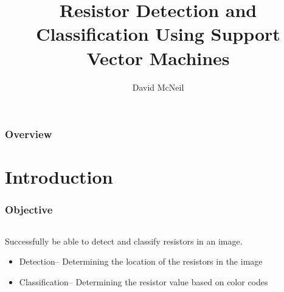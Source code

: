 \documentclass{beamer}
\title[Resistor Identification]{Resistor Detection and Classification Using Support Vector Machines}
\author{David McNeil} %
\institute[RHIT] %
{
Rose-Hulman Institute of Technology \\ %
\medskip
\textit{mcneilde@rose-hulman.edu} %
}
\date{}
\begin{document}
\begin{frame}
\titlepage
\end{frame}

\begin{frame}
\frametitle{Overview}
\tableofcontents %
\end{frame}

\section{Introduction} 

\begin{frame}
\frametitle{Objective}
\begin{columns}[c]
  \column{2.5in}
	\begin{block}{Successfully be able to detect and classify resistors in an image.}
	\begin{itemize}
		\item Detection-- Determining the location of the resistors in the image
		\item Classification-- Determining the resistor value based on color codes
	\end{itemize}
	\end{block}
  \column{1.5in}
\end{columns}
\end{frame}
\end{document}
